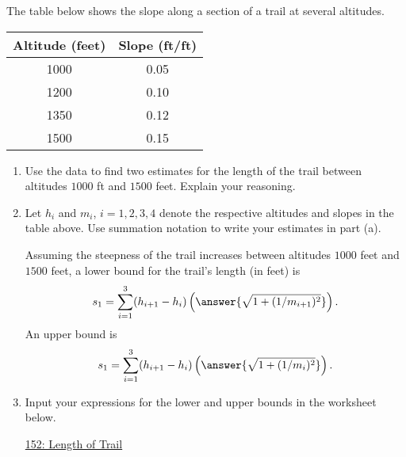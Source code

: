 \documentclass{ximera}
\begin{document}
\begin{exercise}  \label{EX:MnV443fgDF3x}
The table below shows the slope along a section of a trail at several altitudes.


\begin{tabular}{|c|c|}
\hline
Altitude (feet) & Slope (ft/ft) \\
\hline
1000 & 0.05 \\  \hline
1200 & 0.10 \\ \hline
1350 & 0.12 \\ \hline
1500 & 0.15  \\ \hline
\hline
\end{tabular}


\begin{enumerate}
\item Use the data to find two estimates for the length of the trail between altitudes $1000$ ft and $1500$ feet. Explain your reasoning.

\item Let $h_i$ and $m_i$, $i=1,2,3,4$ denote the respective altitudes and slopes in the table above. Use summation notation to write your estimates in part (a).

Assuming the steepness of the trail increases between altitudes $1000$ feet and $1500$ feet, a lower bound for the trail's length (in feet) is
\[
    s_1 = \sum_{i=1}^3 (h_{i+1}-h_{i}) \left( \answer{\sqrt{1+(1/m_{i+1})^2}} \right)  .
\]
An upper bound is
\[
    s_1 = \sum_{i=1}^3(h_{i+1}-h_{i}) \left( \answer{\sqrt{1+(1/m_{i})^2}} \right)  .
\]

\item Input your expressions for the lower and upper bounds in the worksheet below.

\begin{onlineOnly}
    \begin{center}
\end{center}
\end{onlineOnly}

\href{https://www.desmos.com/calculator/mmi4rx2rqp}{152: Length of Trail}

 

\end{enumerate}

\end{exercise}
\end{document}
